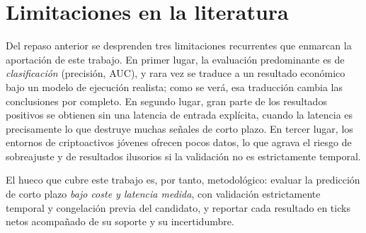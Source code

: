 \section{Limitaciones en la literatura}

Del repaso anterior se desprenden tres limitaciones recurrentes que enmarcan la aportación
de este trabajo. En primer lugar, la evaluación predominante es de \emph{clasificación}
(precisión, AUC), y rara vez se traduce a un resultado económico bajo un modelo de
ejecución realista; como se verá, esa traducción cambia las conclusiones por completo. En
segundo lugar, gran parte de los resultados positivos se obtienen sin una latencia de
entrada explícita, cuando la latencia es precisamente lo que destruye muchas señales de
corto plazo. En tercer lugar, los entornos de criptoactivos jóvenes ofrecen pocos datos,
lo que agrava el riesgo de sobreajuste y de resultados ilusorios si la validación no es
estrictamente temporal.

El hueco que cubre este trabajo es, por tanto, metodológico: evaluar la predicción de
corto plazo \emph{bajo coste y latencia medida}, con validación estrictamente temporal y
congelación previa del candidato, y reportar cada resultado en ticks netos acompañado de
su soporte y su incertidumbre.
